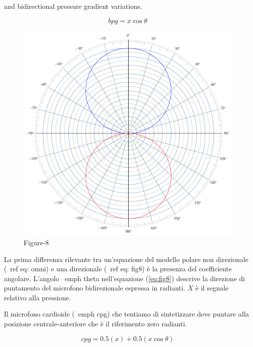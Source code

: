 and bidirectional pressure gradient variations.

\begin{equation}
bpg = x\cos\theta
\label{eq:fig8}
\end{equation}

\begin{figure}[h]
\centering
\includegraphics[width=1\columnwidth]{CAPITOLI/_TIKZ/POLAR/fig8}
\caption{Figure-8}
\label{polar:fig8}
\end{figure}

La prima differenza rilevante tra un'equazione del modello polare non
direzionale (\ ref {eq: omni}) e una direzionale (\ ref {eq: fig8}) è la
presenza del coefficiente angolare. L'angolo \ emph {theta} nell'equazione
(\ref{eq:fig8}) descrive la direzione di puntamento del microfono bidirezionale
espressa in radianti. $ X $ è il segnale relativo alla pressione.

Il microfono cardioide (\ emph {cpg}) che tentiamo di sintetizzare deve puntare
alla posizione centrale-anteriore che è il riferimento zero radianti.

\begin{equation}
cpg = 0.5(x) + 0.5(x\cos\theta)
\label{eq:cardioid}
\end{equation}

